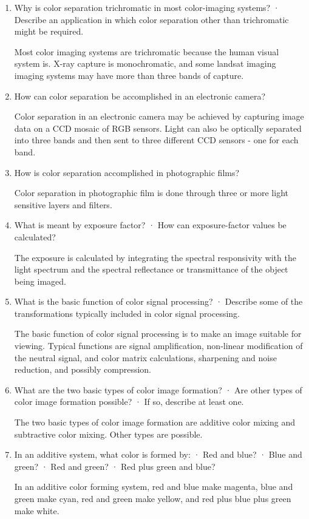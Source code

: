 \documentclass{amsart}
\theoremstyle{definition}
\theoremstyle{remark}
\numberwithin{equation}{section}
\begin{document}
\begin{enumerate}
\item Why is color separation trichromatic in most color-imaging
systems?
 · Describe an application in which color separation other than trichromatic might be required.
 \par Most color imaging systems are trichromatic because the
 human visual system is.  X-ray capture is monochromatic, and some landsat imaging imaging systems
 may have more than three bands of capture.

\item How can color separation be accomplished in an electronic
camera?
\par Color separation in an electronic camera may be achieved by
capturing image data on a CCD mosaic of RGB sensors.  Light can
also be optically separated into three bands and then sent to
three different CCD sensors - one for each band.

\item How is color separation accomplished in photographic films?
\par Color separation in photographic film is done through three
or more light sensitive layers and filters.

\item What is meant by exposure factor?
 · How can exposure-factor values be calculated?
\par The exposure is calculated by integrating the spectral
responsivity with the light spectrum and the spectral reflectance
or transmittance of the object being imaged.

\item What is the basic function of color signal processing?
 · Describe some of the transformations typically included in color signal processing.
\par The basic function of color signal processing is to make an
image suitable for viewing.  Typical functions are signal
amplification, non-linear modification of the neutral signal, and
color matrix calculations, sharpening and noise reduction, and
possibly compression.

\item What are the two basic types of color image formation? · Are
other types of color image formation possible? · If so, describe
at least one.
\par The two basic types of color image formation are additive
color mixing and subtractive color mixing.  Other types are
possible.

\item In an additive system, what color is formed by: · Red and
blue? · Blue and green? · Red and green? · Red plus green and
blue?
\par In an additive color forming system, red and blue make
magenta, blue and green make cyan, red and green make yellow, and
red plus blue plus green make white.


\end{enumerate}
\end{document}
